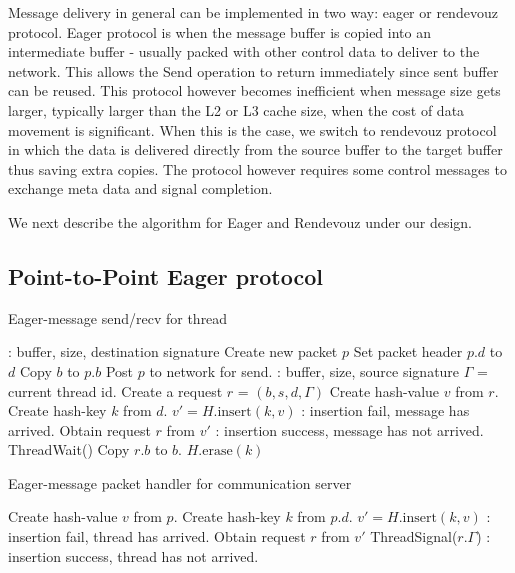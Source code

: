 \documentclass[11pt]{article}
\begin{document}
Message delivery in general can be implemented in two way: eager or rendevouz
protocol. Eager protocol is when the message buffer is copied into an
intermediate buffer - usually packed with other control data to deliver to the
network. This allows the Send operation to return immediately since sent buffer
can be reused.  This protocol however becomes inefficient when message size
gets larger, typically larger than the L2 or L3 cache size, when the cost of
data movement is significant.  When this is the case, we switch to rendevouz
protocol in which the data is delivered directly from the source buffer to the
target buffer thus saving extra copies.  The protocol however requires
some control messages to exchange meta data and signal completion.

We next describe the algorithm for Eager and Rendevouz under our design.
\subsection{Point-to-Point Eager protocol}

\begin{algorithm}
  \caption{Eager-message send/recv for thread}
  \label{algo:short}
  \begin{algorithmic}[1] %
     \Comment: buffer, size, destination signature 
      \State Create new packet $p$
      \State Set packet header $p.d$ to $d$
      \State Copy $b$ to $p.b$
      \State Post $p$ to network for send.
    \EndProcedure
     \Comment: buffer, size, source signature 
      \State $\Gamma$ = current thread id.
      \State Create a request $r$ = $(b,s,d,\Gamma)$
      \State Create hash-value $v$ from $r$.
      \State Create hash-key $k$ from $d$.
      \State $v' = H.\text{insert}(k,v)$
        \Comment: insertion fail, message has arrived.
        \State Obtain request $r$ from $v'$
      \Else
        \Comment: insertion success, message has not arrived.
        \State ThreadWait()
      \EndIf
      \State Copy $r.b$ to $b$.
      \State $H.\text{erase}(k)$
    \EndProcedure
  \end{algorithmic}
\end{algorithm}

\begin{algorithm}
  \caption{Eager-message packet handler for communication server}
  \label{algo:server-short}
  \begin{algorithmic}[1]
      \State Create hash-value $v$ from $p$.
      \State Create hash-key $k$ from $p.d$.
      \State $v' = H.\text{insert}(k,v)$
        \Comment: insertion fail, thread has arrived.
        \State Obtain request $r$ from $v'$
        \State ThreadSignal($r.\Gamma$)
      \Else
        \Comment: insertion success, thread has not arrived.
        \State \Return
      \EndIf
    \EndProcedure
  \end{algorithmic}
\end{algorithm}
\end{document}
